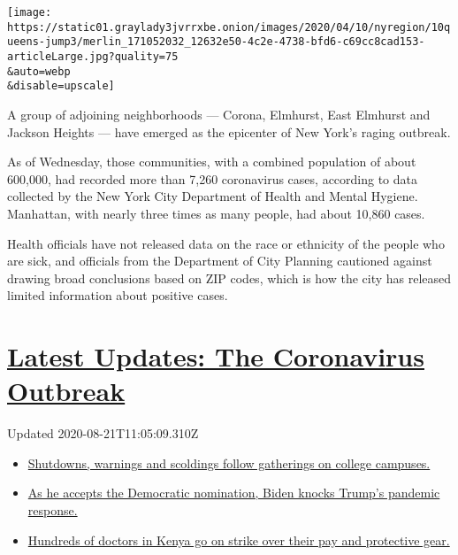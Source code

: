 \texttt{[image: https://static01.graylady3jvrrxbe.onion/images/2020/04/10/nyregion/10queens-jump3/merlin\_171052032\_12632e50-4c2e-4738-bfd6-c69cc8cad153-articleLarge.jpg?quality=75\\\&auto=webp\\\&disable=upscale]}

A group of adjoining neighborhoods --- Corona, Elmhurst, East Elmhurst
and Jackson Heights --- have emerged as the epicenter of New York's
raging outbreak.

As of Wednesday, those communities, with a combined population of about
600,000, had recorded more than 7,260 coronavirus cases, according to
data collected by the New York City Department of Health and Mental
Hygiene. Manhattan, with nearly three times as many people, had about
10,860 cases.

Health officials have not released data on the race or ethnicity of the
people who are sick, and officials from the Department of City Planning
cautioned against drawing broad conclusions based on ZIP codes, which is
how the city has released limited information about positive cases.

\hypertarget{latest-updates-the-coronavirus-outbreak}{%
\section{\texorpdfstring{\href{https://www.nytimes3xbfgragh.onion/2020/08/21/world/covid-19-coronavirus.html?action=click\&pgtype=Article\&state=default\&region=MAIN_CONTENT_1\&context=storylines_live_updates}{Latest
Updates: The Coronavirus
Outbreak}}{Latest Updates: The Coronavirus Outbreak}}\label{latest-updates-the-coronavirus-outbreak}}

Updated 2020-08-21T11:05:09.310Z

\begin{itemize}
\tightlist
\item
  \href{https://www.nytimes3xbfgragh.onion/2020/08/21/world/covid-19-coronavirus.html?action=click\&pgtype=Article\&state=default\&region=MAIN_CONTENT_1\&context=storylines_live_updates\#link-4690b6aa}{Shutdowns,
  warnings and scoldings follow gatherings on college campuses.}
\item
  \href{https://www.nytimes3xbfgragh.onion/2020/08/21/world/covid-19-coronavirus.html?action=click\&pgtype=Article\&state=default\&region=MAIN_CONTENT_1\&context=storylines_live_updates\#link-324af071}{As
  he accepts the Democratic nomination, Biden knocks Trump's pandemic
  response.}
\item
  \href{https://www.nytimes3xbfgragh.onion/2020/08/21/world/covid-19-coronavirus.html?action=click\&pgtype=Article\&state=default\&region=MAIN_CONTENT_1\&context=storylines_live_updates\#link-35890b73}{Hundreds
  of doctors in Kenya go on strike over their pay and protective gear.}
\end{itemize}

